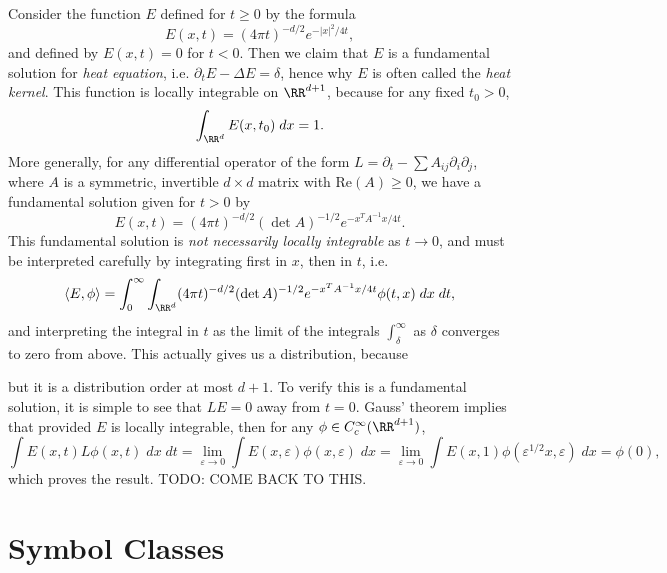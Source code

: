 \begin{example}
    Consider the function $E$ defined for $t \geq 0$ by the formula
    \[ E(x,t) = (4 \pi t)^{-d/2} e^{-|x|^2/4t}, \]
    and defined by $E(x,t) = 0$ for $t < 0$. Then we claim that $E$ is a fundamental solution for \emph{heat equation}, i.e. $\partial_t E - \Delta E = \delta$, hence why $E$ is often called the \emph{heat kernel}. This function is locally integrable on $\RR^{d+1}$, because for any fixed $t_0 > 0$,
    \[ \int_{\RR^d} E(x,t_0)\; dx = 1. \]
    More generally, for any differential operator of the form $L = \partial_t - \sum A_{ij} \partial_i \partial_j$, where $A$ is a symmetric, invertible $d \times d$ matrix with $\text{Re}(A) \geq 0$, we have a fundamental solution given for $t > 0$ by
    \[ E(x,t) = (4 \pi t)^{-d/2} (\det A)^{-1/2} e^{- x^T A^{-1} x / 4t}. \]
    This fundamental solution is \emph{not necessarily locally integrable} as $t \to 0$, and must be interpreted carefully by integrating first in $x$, then in $t$, i.e.
    \[ \langle E, \phi \rangle = \int_0^\infty \int_{\RR^d} (4 \pi t)^{-d/2} (\det A)^{-1/2} e^{-x^T A^{-1} x / 4t} \phi(t,x) \; dx\; dt, \]
    and interpreting the integral in $t$ as the limit of the integrals $\int_\delta^\infty$ as $\delta$ converges to zero from above. This actually gives us a distribution, because 


    but it is a distribution order at most $d + 1$. To verify this is a fundamental solution, it is simple to see that $LE = 0$ away from $t = 0$. Gauss' theorem implies that provided $E$ is locally integrable, then for any $\phi \in C_c^\infty(\RR^{d+1})$,
    \[ \int E(x,t) L\phi(x,t)\; dx\; dt = \lim_{\varepsilon \to 0} \int E(x,\varepsilon) \phi(x,\varepsilon)\; dx = \lim_{\varepsilon \to 0} \int E(x,1) \phi( \varepsilon^{1/2} x, \varepsilon )\; dx = \phi(0), \]
    which proves the result. TODO: COME BACK TO THIS.
\end{example}











\chapter{Symbol Classes}

